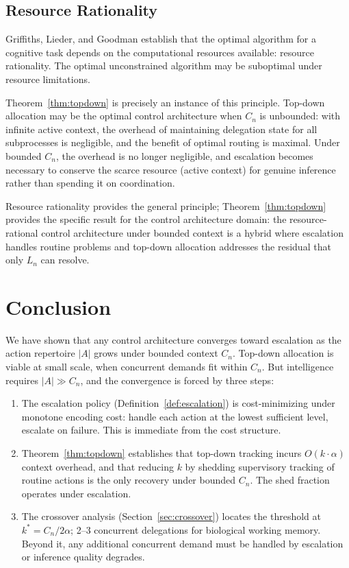 \documentclass[11pt]{article}
\theoremstyle{definition}
\begin{document}
\subsection{Resource Rationality}

Griffiths, Lieder, and Goodman \cite{GriffithsEtAl2015} establish
that the optimal algorithm for a cognitive task depends on the
computational resources available: resource rationality. The
optimal unconstrained algorithm may be suboptimal under resource
limitations.

Theorem~\ref{thm:topdown} is precisely an instance of this principle.
Top-down allocation may be the optimal control architecture when $C_n$
is unbounded: with infinite active context, the overhead of maintaining
delegation state for all subprocesses is negligible, and the benefit
of optimal routing is maximal. Under bounded $C_n$, the overhead is
no longer negligible, and escalation becomes necessary to conserve the
scarce resource (active context) for genuine inference rather than
spending it on coordination.

Resource rationality provides the general principle;
Theorem~\ref{thm:topdown} provides the specific result for the
control architecture domain: the resource-rational control
architecture under bounded context is a hybrid where escalation
handles routine problems and top-down allocation addresses the
residual that only $L_n$ can resolve.

\section{Conclusion}
\label{sec:conclusion}

We have shown that any control architecture converges toward
escalation as the action repertoire $|A|$ grows under bounded context
$C_n$. Top-down allocation is viable at small scale, when concurrent
demands fit within $C_n$. But intelligence requires $|A| \gg C_n$,
and the convergence is forced by three steps:

\begin{enumerate}
\item The escalation policy (Definition~\ref{def:escalation}) is
   cost-minimizing under monotone encoding cost: handle each action at
   the lowest sufficient level, escalate on failure. This is immediate
   from the cost structure.

\item Theorem~\ref{thm:topdown} establishes that top-down tracking
   incurs $O(k \cdot \alpha)$ context overhead, and that reducing $k$
   by shedding supervisory tracking of routine actions is the only
   recovery under bounded $C_n$. The shed fraction operates under
   escalation.

\item The crossover analysis (Section~\ref{sec:crossover}) locates the
   threshold at $k^* = C_n / 2\alpha$; 2--3 concurrent delegations
   for biological working memory. Beyond it, any additional concurrent
   demand must be handled by escalation or inference quality degrades.
\end{enumerate}
\end{document}
